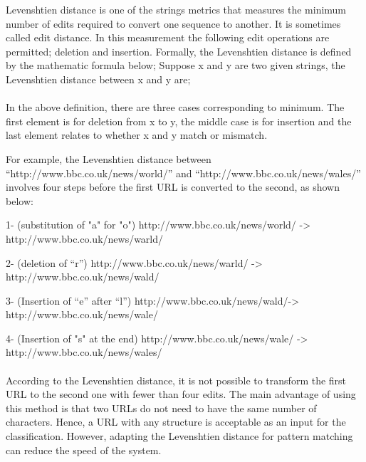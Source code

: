 Levenshtien distance is one of the strings metrics that measures the minimum number of edits required to convert one sequence to another. It is sometimes called edit distance. In this measurement the following edit operations are permitted; deletion and insertion. 
Formally, the Levenshtien distance is defined by the mathematic formula below;
Suppose x and y are two given strings, the Levenshtien distance between x and y are;
%


%

\paragraph{} 
In the above definition, there are three cases corresponding to minimum. The first element is for deletion from x to y, the middle case is for insertion and the last element relates to whether x and y match or mismatch\cite{Levenshtein}.  

For example, the Levenshtien distance between “http://www.bbc.co.uk/news/world/” and “http://www.bbc.co.uk/news/wales/” involves four steps before the first URL is converted to the second, as shown below:

1-	(substitution of "a" for "o")
http://www.bbc.co.uk/news/world/ -> http://www.bbc.co.uk/news/warld/

2-	(deletion of “r”)
http://www.bbc.co.uk/news/warld/ -> http://www.bbc.co.uk/news/wald/

3-	(Insertion of “e” after “l”)
http://www.bbc.co.uk/news/wald/-> http://www.bbc.co.uk/news/wale/

4-	(Insertion of "s" at the end)
http://www.bbc.co.uk/news/wale/ -> http://www.bbc.co.uk/news/wales/

\paragraph{} 
According to the Levenshtien distance, it is not possible to transform the first URL to the second one with fewer than four edits. The main advantage of using this method is that two URLs do not need to have the same number of characters. Hence, a URL with any structure is acceptable as an input for the classification. However, adapting the Levenshtien distance for pattern matching can reduce the speed of the system.

